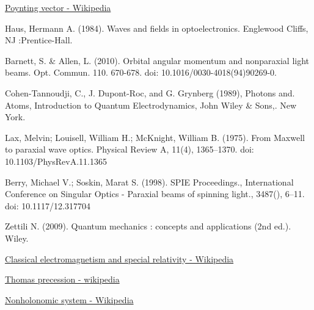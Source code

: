 \documentclass[11pt,a4paper]{article}
\numberwithin{equation}{section}
\begin{document}
\begin{thebibliography}{999}
	 \href{https://en.wikipedia.org/wiki/Poynting_vector}{Poynting vector - Wikipedia}
	  
	 Haus, Hermann A. (1984). Waves and fields in optoelectronics. Englewood Cliffs, NJ :Prentice-Hall.
	 
	 Barnett, S. \& Allen, L. (2010). Orbital angular momentum and nonparaxial light beams. Opt. Commun. 110. 670-678. doi: 10.1016/0030-4018(94)90269-0.
	 
	 Cohen-Tannoudji, C., J. Dupont-Roc, and G. Grynberg (1989), Photons and. Atoms, Introduction to Quantum Electrodynamics, John Wiley \& Sons,. New York.
	 
	 Lax, Melvin; Louisell, William H.; McKnight, William B. (1975). From Maxwell to paraxial wave optics. Physical Review A, 11(4), 1365–1370. doi: 10.1103/PhysRevA.11.1365
	 
	  Berry, Michael V.; Soskin, Marat S. (1998). SPIE Proceedings., International Conference on Singular Optics - Paraxial beams of spinning light., 3487(), 6–11. doi: 10.1117/12.317704 
	  
	  
	  
	  Zettili N. (2009). Quantum mechanics : concepts and applications (2nd ed.). Wiley.
	  
	  \href{https://en.wikipedia.org/wiki/Classical_electromagnetism_and_special_relativity}{Classical electromagnetism and special relativity - Wikipedia}
	  
	  \href{https://en.wikipedia.org/wiki/Thomas_precession}{Thomas precession - wikipedia}
	  
	  
	  \href{https://en.wikipedia.org/wiki/Nonholonomic_system}{Nonholonomic system - Wikipedia}
	  

\end{thebibliography}
\end{document}
